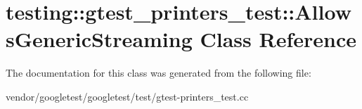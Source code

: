 \hypertarget{classtesting_1_1gtest__printers__test_1_1_allows_generic_streaming}{}\section{testing\+:\+:gtest\+\_\+printers\+\_\+test\+:\+:Allows\+Generic\+Streaming Class Reference}
\label{classtesting_1_1gtest__printers__test_1_1_allows_generic_streaming}


The documentation for this class was generated from the following file\+:\begin{DoxyCompactItemize}
\item 
vendor/googletest/googletest/test/gtest-\/printers\+\_\+test.\+cc\end{DoxyCompactItemize}
